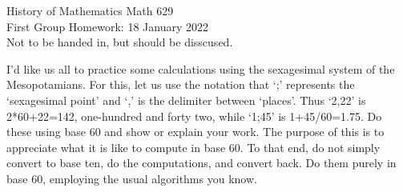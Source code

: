 \documentclass[12pt]{article}
\begin{document}
\LARGE 
\noindent
{\color{Maroon}History of Mathematics \hfill Math 629}\vspace{2pt}\\
\large
First Group Homework: \hfill 18 January 2022\\
Not to be handed in, but should be disscused.
\normalsize\vspace{10pt}


 I'd like us all to practice some calculations using the sexagesimal system of the Mesopotamians. For this, let us use the notation that
    `;' represents the `sexagesimal point' and `,' is the delimiter between `places'. Thus `2,22' is 2*60+22=142, one-hundred and forty two,
    while `1;45' is 1+45/60=1.75. Do these using base 60 and show or explain your work. The purpose of this is to appreciate what it is like
    to compute in base 60. To that end, do not simply convert to base ten, do the computations, and convert back. Do them purely in base 60,
    employing the usual algorithms you know.
\end{document}
